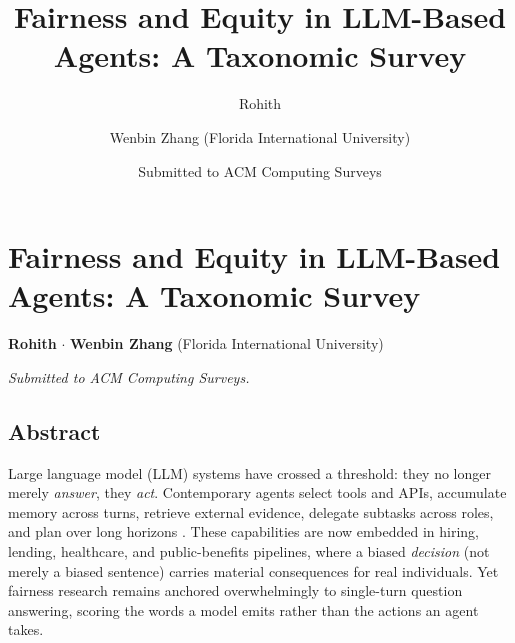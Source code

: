 \documentclass[10pt]{article}
\title{Fairness and Equity in LLM-Based Agents: A Taxonomic Survey}
\author{Rohith \and Wenbin Zhang (Florida International University)}
\date{Submitted to ACM Computing Surveys}
\begin{document}
\maketitle
\section*{Fairness and Equity in LLM-Based Agents: A Taxonomic Survey}

\textbf{Rohith}  $\cdot$  \textbf{Wenbin Zhang} (Florida International University)

\emph{Submitted to ACM Computing Surveys.}


\subsection*{Abstract}

Large language model (LLM) systems have crossed a threshold: they no longer merely \emph{answer}, they \emph{act}. Contemporary agents select tools and APIs, accumulate memory across turns, retrieve external evidence, delegate subtasks across roles, and plan over long horizons \cite{wang2024survey,xi2023rise,yao2023react}. These capabilities are now embedded in hiring, lending, healthcare, and public-benefits pipelines, where a biased \emph{decision} (not merely a biased sentence) carries material consequences for real individuals. Yet fairness research remains anchored overwhelmingly to single-turn question answering, scoring the words a model emits rather than the actions an agent takes.
\end{document}
